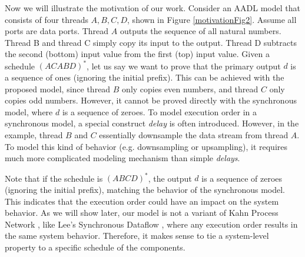 Now we will illustrate the motivation of our work.
Consider an AADL model that consists of four threads $A, B, C, D$, shown in Figure \ref{motivationFig2}. Assume all ports are data ports. Thread $A$ outputs the sequence of all natural numbers. Thread B and thread C simply copy its input to the output. Thread D subtracts the second (bottom) input value from the first (top) input value. Given a schedule $(ACABD)^*$, let us say we want to prove that the primary output $d$ is a sequence of ones (ignoring the initial prefix). This can be achieved with the proposed model, since thread $B$ only copies even numbers, and thread $C$ only copies odd numbers. However, it cannot be proved directly with the synchronous model, where $d$ is a sequence of zeroes. To model execution order in a synchronous model, a special construct \emph{delay} is often introduced. However, in the example, thread $B$ and $C$ essentially downsample the data stream from thread $A$. To model this kind of behavior (e.g. downsampling or upsampling), it requires much more complicated modeling mechanism than simple \emph{delays}. 

Note that if the schedule is $(ABCD)^*$, the output $d$ is a sequence of zeroes (ignoring the initial prefix), matching the behavior of the synchronous model. This indicates that the execution order could have an impact on the system behavior. As we will show later, our model is not a variant of Kahn Process Network \cite{KPN}, like Lee's Synchronous Dataflow \cite{SDF}, where any execution order results in the same system behavior. Therefore, it makes sense to tie a system-level property to a specific schedule of the components.


 
  